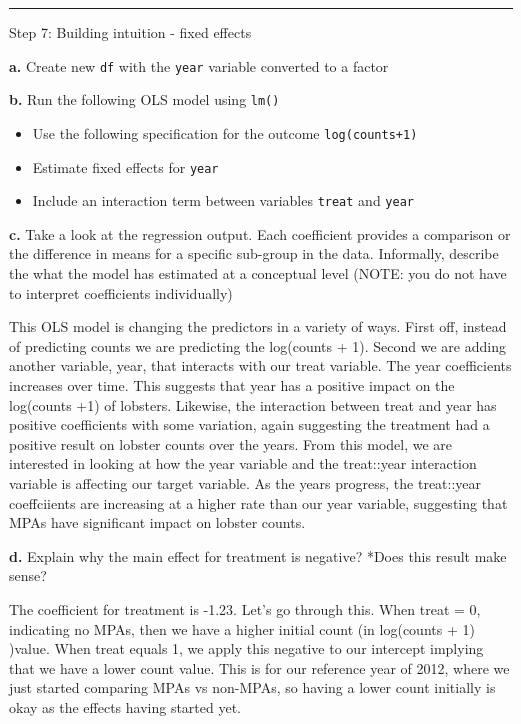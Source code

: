 \documentclass[
]{article}
\providecommand{\tightlist}{%
  \setlength{\itemsep}{0pt}\setlength{\parskip}{0pt}}
\begin{document}
\begin{center}\rule{0.5\linewidth}{0.5pt}\end{center}

Step 7: Building intuition - fixed effects

\textbf{a.} Create new \texttt{df} with the \texttt{year} variable
converted to a factor

\textbf{b.} Run the following OLS model using \texttt{lm()}

\begin{itemize}
\tightlist
\item
  Use the following specification for the outcome \texttt{log(counts+1)}
\item
  Estimate fixed effects for \texttt{year}
\item
  Include an interaction term between variables \texttt{treat} and
  \texttt{year}
\end{itemize}

\textbf{c.} Take a look at the regression output. Each coefficient
provides a comparison or the difference in means for a specific
sub-group in the data. Informally, describe the what the model has
estimated at a conceptual level (NOTE: you do not have to interpret
coefficients individually)

This OLS model is changing the predictors in a variety of ways. First
off, instead of predicting counts we are predicting the log(counts + 1).
Second we are adding another variable, year, that interacts with our
treat variable. The year coefficients increases over time. This suggests
that year has a positive impact on the log(counts +1) of lobsters.
Likewise, the interaction between treat and year has positive
coefficients with some variation, again suggesting the treatment had a
positive result on lobster counts over the years. From this model, we
are interested in looking at how the year variable and the treat::year
interaction variable is affecting our target variable. As the years
progress, the treat::year coeffciients are increasing at a higher rate
than our year variable, suggesting that MPAs have significant impact on
lobster counts.

\textbf{d.} Explain why the main effect for treatment is negative? *Does
this result make sense?

The coefficient for treatment is -1.23. Let's go through this. When
treat = 0, indicating no MPAs, then we have a higher initial count (in
log(counts + 1) )value. When treat equals 1, we apply this negative to
our intercept implying that we have a lower count value. This is for our
reference year of 2012, where we just started comparing MPAs vs
non-MPAs, so having a lower count initially is okay as the effects
having started yet.
\end{document}
